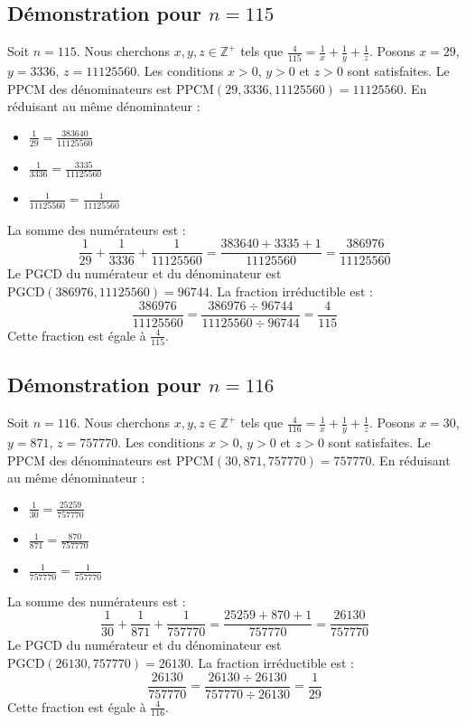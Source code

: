 \documentclass[11pt,a4paper]{article}
\begin{document}
\subsection{Démonstration pour $n = 115$}
Soit $n = 115$. Nous cherchons $x, y, z \in \mathbb{Z}^{+}$ tels que $\frac{4}{115} = \frac{1}{x} + \frac{1}{y} + \frac{1}{z}$.
Posons $x = 29$, $y = 3336$, $z = 11125560$.
Les conditions $x > 0$, $y > 0$ et $z > 0$ sont satisfaites.
Le PPCM des dénominateurs est $\text{PPCM}(29, 3336, 11125560) = 11125560$.
En réduisant au même dénominateur :
\begin{itemize}
    \item $\frac{1}{29} = \frac{383640}{11125560}$
    \item $\frac{1}{3336} = \frac{3335}{11125560}$
    \item $\frac{1}{11125560} = \frac{1}{11125560}$
\end{itemize}
La somme des numérateurs est :
$$ \frac{1}{29} + \frac{1}{3336} + \frac{1}{11125560} = \frac{383640 + 3335 + 1}{11125560} = \frac{386976}{11125560} $$
Le PGCD du numérateur et du dénominateur est $\text{PGCD}(386976, 11125560) = 96744$.
La fraction irréductible est :
$$ \frac{386976}{11125560} = \frac{386976 \div 96744}{11125560 \div 96744} = \frac{4}{115} $$
Cette fraction est égale à $\frac{4}{115}$.

\subsection{Démonstration pour $n = 116$}
Soit $n = 116$. Nous cherchons $x, y, z \in \mathbb{Z}^{+}$ tels que $\frac{4}{116} = \frac{1}{x} + \frac{1}{y} + \frac{1}{z}$.
Posons $x = 30$, $y = 871$, $z = 757770$.
Les conditions $x > 0$, $y > 0$ et $z > 0$ sont satisfaites.
Le PPCM des dénominateurs est $\text{PPCM}(30, 871, 757770) = 757770$.
En réduisant au même dénominateur :
\begin{itemize}
    \item $\frac{1}{30} = \frac{25259}{757770}$
    \item $\frac{1}{871} = \frac{870}{757770}$
    \item $\frac{1}{757770} = \frac{1}{757770}$
\end{itemize}
La somme des numérateurs est :
$$ \frac{1}{30} + \frac{1}{871} + \frac{1}{757770} = \frac{25259 + 870 + 1}{757770} = \frac{26130}{757770} $$
Le PGCD du numérateur et du dénominateur est $\text{PGCD}(26130, 757770) = 26130$.
La fraction irréductible est :
$$ \frac{26130}{757770} = \frac{26130 \div 26130}{757770 \div 26130} = \frac{1}{29} $$
Cette fraction est égale à $\frac{4}{116}$.
\end{document}
